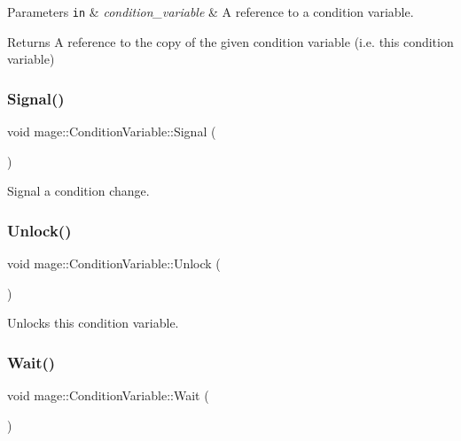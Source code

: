 \begin{DoxyParams}[1]{Parameters}
\mbox{\tt in}  & {\em condition\+\_\+variable} & A reference to a condition variable. \\
\hline
\end{DoxyParams}
\begin{DoxyReturn}{Returns}
A reference to the copy of the given condition variable (i.\+e. this condition variable) 
\end{DoxyReturn}
\hypertarget{classmage_1_1_condition_variable_a09e52f0d51c10ee565a895d2444175d9}{}\label{classmage_1_1_condition_variable_a09e52f0d51c10ee565a895d2444175d9} 
\subsubsection{\texorpdfstring{Signal()}{Signal()}}
{\footnotesize\ttfamily void mage\+::\+Condition\+Variable\+::\+Signal (\begin{DoxyParamCaption}{ }\end{DoxyParamCaption})}

Signal a condition change. \hypertarget{classmage_1_1_condition_variable_a3b3fe63417b7d7adedc9fe015fc7feea}{}\label{classmage_1_1_condition_variable_a3b3fe63417b7d7adedc9fe015fc7feea} 
\subsubsection{\texorpdfstring{Unlock()}{Unlock()}}
{\footnotesize\ttfamily void mage\+::\+Condition\+Variable\+::\+Unlock (\begin{DoxyParamCaption}{ }\end{DoxyParamCaption})}

Unlocks this condition variable. \hypertarget{classmage_1_1_condition_variable_abc279c54285145d981f409c2d110c85a}{}\label{classmage_1_1_condition_variable_abc279c54285145d981f409c2d110c85a} 
\subsubsection{\texorpdfstring{Wait()}{Wait()}}
{\footnotesize\ttfamily void mage\+::\+Condition\+Variable\+::\+Wait (\begin{DoxyParamCaption}{ }\end{DoxyParamCaption})}

